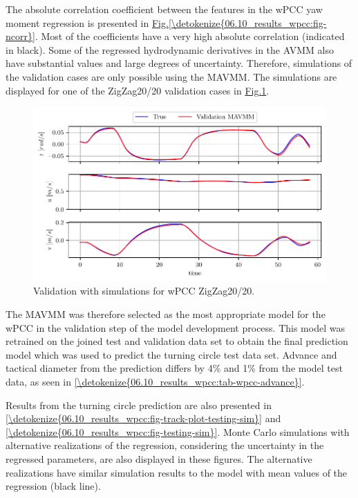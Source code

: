 \clearpage
The absolute correlation coefficient between the features in the wPCC yaw moment regression is presented in \hyperref[\detokenize{06.10_results_wpcc:fig-ncorr}]{Fig.\@ \ref{\detokenize{06.10_results_wpcc:fig-ncorr}}}. Most of the coefficients have a very high absolute correlation (indicated in black). Some of the regressed hydrodynamic derivatives in the AVMM also have substantial values and large degrees of uncertainty. Therefore, simulations of the validation cases are only possible using the MAVMM. The simulations are displayed for one of the ZigZag20/20 validation cases in \hyperref[\detokenize{06.10_results_wpcc:fig-validation-sim}]{Fig.\@ \ref{\detokenize{06.10_results_wpcc:fig-validation-sim}}}.
\begin{figure}[h!]
\centering
\includegraphics[width=1.0\textwidth]{kappa/images/9.pdf}
\caption{Validation with simulations for wPCC ZigZag20/20.}\label{\detokenize{06.10_results_wpcc:fig-validation-sim}}\end{figure}
The MAVMM was therefore selected as the most appropriate model for the wPCC in the validation step of the model development process. This model was retrained on the joined test and validation data set to obtain the final prediction model which was used to predict the turning circle test data set. Advance and tactical diameter \cite{imo_standards_2002} from the prediction differs by 4\% and 1\% from the model test data, as seen in \autoref{\detokenize{06.10_results_wpcc:tab-wpcc-advance}}.

Results from the turning circle prediction are also presented in  \autoref{\detokenize{06.10_results_wpcc:fig-track-plot-testing-sim}} and  \autoref{\detokenize{06.10_results_wpcc:fig-testing-sim}}. Monte Carlo simulations with alternative realizations of the regression, considering the uncertainty in the regressed parameters, are also displayed in these figures. The alternative realizations have similar simulation results to the model with mean values of the regression (black line).
